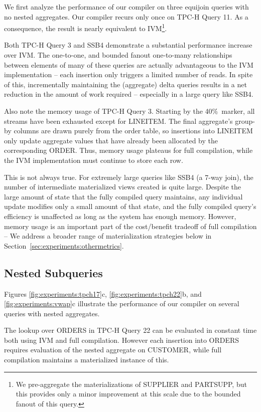We first analyze the performance of our compiler on three equijoin queries with no nested aggregates.  Our compiler recurs only once on TPC-H Query 11.  As a consequence, the result is nearly equivalent to IVM\footnote{We pre-aggregate the materializations of SUPPLIER and PARTSUPP, but this provides only a minor improvement at this scale due to the bounded fanout of this query.}.  

Both TPC-H Query 3 and SSB4 demonstrate a substantial performance increase over IVM.  The one-to-one, and bounded fanout one-to-many relationships between elements of many of these queries are actually advantageous to the IVM implementation -- each insertion only triggers a limited number of reads.  In spite of this, incrementally maintaining the (aggregate) delta queries results in a net reduction in the amount of work required -- especially in a large query like SSB4.

Also note the memory usage of TPC-H Query 3.  Starting by the 40\%\ marker, all streams have been exhausted except for LINEITEM.  The final aggregate's group-by columns are drawn purely from the order table, so insertions into LINEITEM only update aggregate values that have already been allocated by the corresponding ORDER.  Thus, memory usage plateaus for full compilation, while the IVM implementation must continue to store each row.

This is not always true.  For extremely large queries like SSB4 (a 7-way join), the number of intermediate materialized views created is quite large.  Despite the large amount of state that the fully compiled query maintains, any individual update modifies only a small amount of that state, and the fully compiled query's efficiency is unaffected as long as the system has enough memory.  However, memory usage is an important part of the cost/benefit tradeoff of full compilation -- We address a broader range of materialization strategies below in Section~\ref{sec:experiments:othermetrics}.

\subsection{Nested Subqueries}

Figures \ref{fig:experiments:tpch17}c, \ref{fig:experiments:tpch22}b, and \ref{fig:experiments:vwap}c illustrate the performance of our compiler on several queries with nested aggregates.

The lookup over ORDERS in TPC-H Query 22 can be evaluated in constant time both using IVM and full compilation.  However each insertion into ORDERS requires evaluation of the nested aggregate on CUSTOMER, while full compilation maintains a materialized instance of this.

